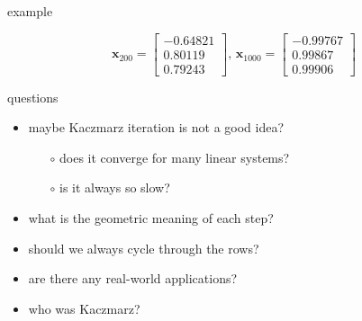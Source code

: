 \documentclass[usepdftitle=false,usenames,dvipsnames]{beamer}
\newcommand{\bx}{\mathbf{x}}
\begin{document}
\begin{frame}{example}
\begin{itemize}
{$$\bx_{200}=\begin{bmatrix} -0.64821 \\  0.80119 \\  0.79243 \end{bmatrix}, \,
\bx_{1000}=\begin{bmatrix} -0.99767 \\  0.99867 \\  0.99906 \end{bmatrix}$$}
\end{itemize}
\end{frame}


\begin{frame}{questions}

\begin{itemize}
\item maybe Kaczmarz iteration is not a good idea?
    \begin{itemize}
    \item[$\circ$] does it converge for many linear systems?
    \item[$\circ$] is it always so slow?
    \end{itemize}
\item what is the geometric meaning of each step?
\item should we always cycle through the rows?
\item are there any real-world applications?
\item who was Kaczmarz?
\end{itemize}
\end{frame}
\end{document}
